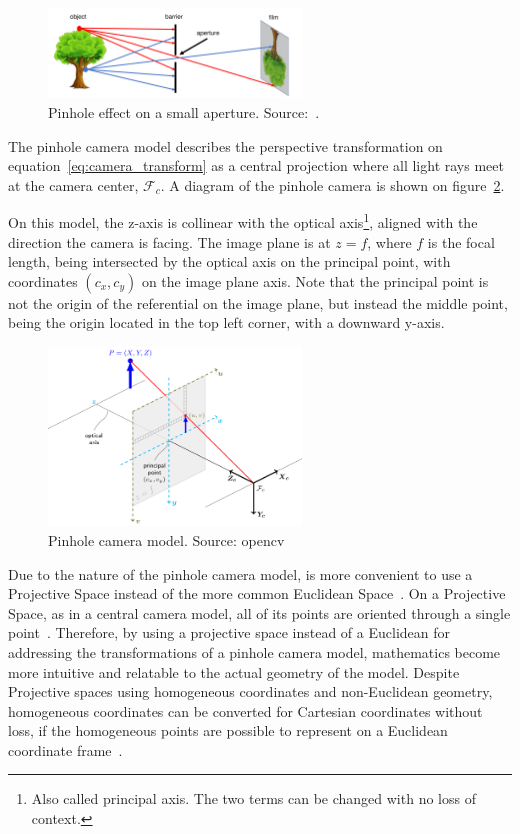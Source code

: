 \begin{figure}[H]
	\centering
	\includegraphics[width=0.6\textwidth]{img/camera/pnhole_effect.png}
	\caption{Pinhole effect on a small aperture. Source:~\cite{camera_models}.}
	\label{fig:pinhole_effect}
\end{figure}

The pinhole camera model describes the perspective transformation on equation~\eqref{eq:camera_transform} as a central projection where all light rays meet at the camera center, $\mathcal{F}_c$. A diagram of the pinhole camera is shown on figure~\ref{fig:pinhole_camera_model}. 

On this model, the z-axis is collinear with the optical axis\footnote{Also called principal axis. The two terms can be changed with no loss of context.}, aligned with the direction the camera is facing. The image plane is at $z = f$, where $f$ is the focal length, being intersected by the optical axis on the principal point, with coordinates $(c_x, c_y)$ on the image plane axis. Note that the principal point is not the origin of the referential on the image plane, but instead the middle point, being the origin located in the top left corner, with a downward y-axis.

\begin{figure}[H]
	\centering
	\includegraphics[width=0.6\textwidth]{img/camera/pinhole_camera_model.png}
	\caption{Pinhole camera model. Source: \acl{opencv}~\cite{opencv_doc}}
	\label{fig:pinhole_camera_model}
\end{figure}

Due to the nature of the pinhole camera model, is more convenient to use a Projective Space instead of the more common Euclidean Space~\cite{mvg_book, camera_models, Sturm2010}. On a Projective Space, as in a central camera model, all of its points are oriented through a single point~\cite{mvg_book}. Therefore, by using a projective space instead of a Euclidean for addressing the transformations of a pinhole camera model, mathematics become more intuitive and relatable to the actual geometry of the model. Despite Projective spaces using homogeneous coordinates and non-Euclidean geometry, homogeneous coordinates can be converted for Cartesian coordinates without loss, if the homogeneous points are possible to represent on a Euclidean coordinate frame~\cite{mvg_book, camera_models}.

